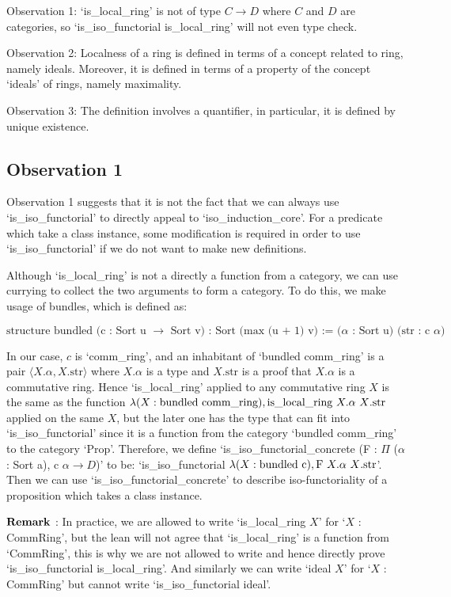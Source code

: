 \documentclass[11pt]{article}
\begin{document}
Observation 1: `is\_local\_ring' is not of type $C\to D$ where $C$ and $D$ are categories, so `is\_iso\_functorial is\_local\_ring' will not even type check.

Observation 2: Localness of a ring is defined in terms of a concept related to ring, namely ideals. Moreover, it is defined in terms of a property of the concept `ideals' of rings, namely maximality.

Observation 3: The definition involves a quantifier, in particular, it is defined by unique existence.

\subsection{Observation 1}

Observation 1 suggests that it is not the fact that we can always use `is\_iso\_functorial' to directly appeal to `iso\_induction\_core'. For a predicate which take a class instance, some modification is required in order to use `is\_iso\_functorial' if we do not want to make new definitions. 

Although `is\_local\_ring' is not a directly a function from a category, we can use currying to collect the two arguments to form a category. To do this, we make usage of bundles, which is defined as:

\[\text{structure bundled (c : Sort u $\to$ Sort v) : Sort (max (u + 1) v) :=
($\alpha$ : Sort u)
(str : c $\alpha$)}\]

In our case, $c$ is `comm\_ring', and an inhabitant of `bundled comm\_ring' is a pair $\langle X.\alpha,X.\text{str}\rangle$ where 
$X.\alpha$ is a type and $X.\text{str}$ is a proof that $X.\alpha$ is a commutative ring. Hence `is\_local\_ring' applied to any commutative ring $X$ is the same as the function $\lambda (X: \text{bundled comm\_ring}), \text{is\_local\_ring $X.\alpha$ $X$\text{.str}}$ applied on the same $X$, but the later one has the type that can fit into `is\_iso\_functorial' since it is a function from the category `bundled comm\_ring' to the category `Prop'. Therefore, we define `is\_iso\_functorial\_concrete (F : $\Pi$ ($\alpha$: Sort a), c $\alpha \to D$)' to be: `is\_iso\_functorial $\lambda (X: \text{bundled c}), \text{F $X.\alpha$ $X$\text{.str}}$'. Then we can use `is\_iso\_functorial\_concrete' to describe iso-functoriality of a proposition which takes a class instance.

$\bf  Remark$ : In practice, we are allowed to write `is\_local\_ring $X$' for `$X$ : CommRing', but the lean will not agree that `is\_local\_ring' is a function from `CommRing', this is why we are not allowed to write and hence directly prove `is\_iso\_functorial is\_local\_ring'. And similarly we can write `ideal $X$' for `$X$ : CommRing' but cannot write `is\_iso\_functorial ideal'.
\end{document}
